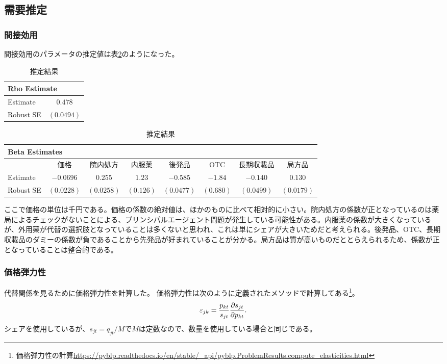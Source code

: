 \documentclass[a4paper,11pt,uplatex]{jsarticle}
\theoremstyle{definition}
\begin{document}
\subsection{需要推定}
\subsubsection{間接効用}
間接効用のパラメータの推定値は表\ref{indirect_utility}のようになった。
\begin{table}[H]
    \centering
    \footnotesize
    \caption{推定結果}\label{indirect_utility}
    \begin{tabular}{l c}
        \toprule
        \multicolumn{2}{l}{Rho Estimate} \\
        \midrule
        Estimate & $0.478$\\
        Robust SE & $(0.0494)$ \\
        \bottomrule
    \end{tabular}

    \vspace{1em}
    \footnotesize
    \begin{tabular}{lccccccc}
        \toprule
        \multicolumn{8}{l}{Beta Estimates} \\
        \midrule
        & 価格 & 院内処方 & 内服薬 & 後発品 & OTC & 長期収載品 & 局方品 \\
        \midrule
        Estimate & $-0.0696$ & $0.255$ & $1.23$ & $-0.585 $ & $-1.84 $ & $-0.140 $ & $0.130 $ \\
        Robust SE & $(0.0228 )$ & $(0.0258 )$ & $(0.126 )$ & $(0.0477)$ & $(0.680)$ & $(0.0499 )$ & $(0.0179 )$ \\
        \bottomrule
    \end{tabular}
\end{table}
ここで価格の単位は千円である。価格の係数の絶対値は、ほかのものに比べて相対的に小さい。院内処方の係数が正となっているのは薬局によるチェックがないことによる、プリンシパルエージェント問題が発生している可能性がある。内服薬の係数が大きくなっているが、外用薬が代替の選択肢となっていることは多くないと思われ、これは単にシェアが大きいためだと考えられる。後発品、OTC、長期収載品のダミーの係数が負であることから先発品が好まれていることが分かる。局方品は質が高いものだととらえられるため、係数が正となっていることは整合的である。
\subsubsection{価格弾力性}
代替関係を見るために価格弾力性を計算した。
価格弾力性は次のように定義されたメソッドで計算してある\footnote{価格弾力性の計算\url{https://pyblp.readthedocs.io/en/stable/_api/pyblp.ProblemResults.compute_elasticities.html}}。
\begin{align*}
\varepsilon_{jk}=\frac{p_{kt}}{s_{jt}} \pdv{s_{jt}}{p_{kt}}.
\end{align*}
シェアを使用しているが、\(s_{jt}=q_{jt}/M\)で\(M\)は定数なので、数量を使用している場合と同じである。
\end{document}
